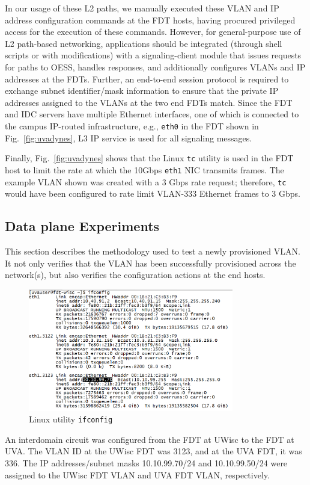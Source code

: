 In our usage of these L2 paths,
we manually executed these VLAN and IP address configuration commands at the FDT hosts, having procured privileged access for the execution of these commands. However, for general-purpose use of L2 path-based networking, applications should be integrated (through shell scripts or with
modifications) with a signaling-client module that issues requests for paths to OESS, handles responses, and additionally configures VLANs and IP addresses at the FDTs. Further, an end-to-end session protocol is required to exchange
subnet identifier/mask information to ensure that the private IP addresses assigned to the VLANs at the two end
FDTs match. Since the FDT and IDC servers have multiple Ethernet interfaces, one of which is connected to the campus IP-routed
infrastructure, e.g., \texttt{eth0} in the FDT shown in Fig.~\ref{fig:uvadynes}, L3 IP
service is used for all signaling messages.

Finally, Fig.~\ref{fig:uvadynes} shows that the Linux \texttt{tc} utility is used in the
FDT host to limit the rate at which the 10Gbps \texttt{eth1} NIC
transmits frames. The example VLAN shown was created
with a 3 Gbps rate request; therefore, \texttt{tc} would have been
configured to rate limit VLAN-333 Ethernet frames to 3
Gbps.

\subsection{Data plane Experiments}
\label{sec:multidomain-SDN-data-plane-expts}

This section describes the methodology used to test a newly provisioned VLAN.
It not only verifies that the VLAN has been successfully provisioned across the network(s), 
but also verifies the configuration actions at the end hosts.
\begin{figure}[htb!]
\centering
\includegraphics[width=0.8\textwidth]{figures/ifconfig.png}
\caption{Linux utility \texttt{ifconfig}}
\label{fig:ifconfig}
\end{figure}
An interdomain circuit was configured from the FDT at UWisc to the FDT at UVA. The VLAN ID
at the UWisc FDT was 3123, and at the UVA FDT, it was 336. The IP addresses/subnet masks 10.10.99.70/24 and 10.10.99.50/24 were assigned to the UWisc FDT VLAN and UVA FDT VLAN,
respectively.

